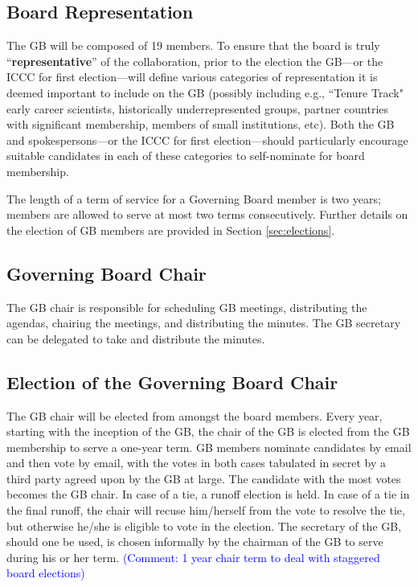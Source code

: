 \documentclass[12pt]{article}
\newcommand{\Comment}[1]{\textcolor{Blue}{(Comment: #1)}}
\begin{document}
%

\subsection{Board Representation}
The GB will be composed of 19 members. 
To ensure that the board is truly ``\textbf{representative}'' of the collaboration, prior to the election the GB---or the ICCC for first election---will define various categories of representation it is deemed important to include on the GB (possibly including e.g., ``Tenure Track" early career scientists,  historically underrepresented groups, partner countries with significant membership, members of small institutions, etc). Both the GB and spokespersons---or the ICCC for first election---should particularly encourage suitable candidates in each of these categories to self-nominate for board membership.

The length of a term of service for a Governing Board member is two years; members are allowed to serve at most two terms consecutively.
Further details on the election of GB members are provided in Section \ref{sec:elections}.


\subsection{Governing Board Chair}

The GB chair is responsible for scheduling GB meetings, distributing the agendas, chairing the meetings, and distributing the minutes. The GB secretary can be delegated to take and distribute the minutes. 

\subsection{Election of the Governing Board Chair}
The GB chair will be elected from amongst the board members. 
Every year, starting with the inception of the GB, the chair of the GB is elected from the GB membership to serve a one-year term. GB members nominate candidates by email and then vote by email, with the votes in both cases tabulated in secret by a third party agreed upon by the GB at large. The candidate with the most votes becomes the GB chair. In case of a tie, a runoff election is held. In case of a tie in the final runoff, the chair will recuse him/herself from the vote to resolve the tie, but otherwise he/she is eligible to vote in the election. The secretary of the GB, should one be used, is chosen informally by the chairman of the GB to serve during his or her term. \Comment{1 year chair term to deal with staggered board elections}
\end{document}
